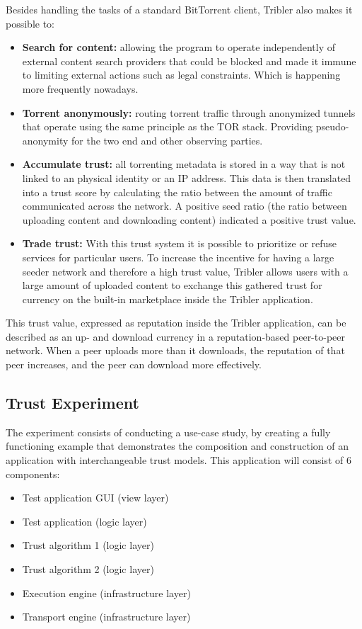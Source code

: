 Besides handling the tasks of a standard BitTorrent client, Tribler also makes it possible to:

\begin{itemize}
	\item \textbf{Search for content: } allowing the program to operate independently of external content search providers that could be blocked and made it immune to limiting external actions such as legal constraints. Which is happening more frequently nowadays.
	\item \textbf{Torrent anonymously: } routing torrent traffic through anonymized tunnels that operate using the same principle as the TOR stack. Providing pseudo-anonymity for the two end and other observing parties.
	\item \textbf{Accumulate trust: } all torrenting metadata is stored in a way that is not linked to an physical identity or an IP address. This data is then translated into a trust score by calculating the ratio between the amount of traffic communicated across the network. A positive seed ratio (the ratio between uploading content and downloading content) indicated a positive trust value.
	\item \textbf{Trade trust: } With this trust system it is possible to prioritize or refuse services for particular users. To increase the incentive for having a large seeder network and therefore a high trust value, Tribler allows users with a large amount of uploaded content to exchange this gathered trust for currency on the built-in marketplace inside the Tribler application.
\end{itemize}

This trust value, expressed as reputation inside the Tribler application, can be described as an up- and download currency in a reputation-based peer-to-peer network. When a peer uploads more than it downloads, the reputation of that peer increases, and the peer can download more effectively.

\subsection{Trust Experiment}

The experiment consists of conducting a use-case study, by creating a fully functioning example that demonstrates the composition and construction of an application with interchangeable trust models. This application will consist of 6 components:

\begin{itemize}
	\item Test application GUI (view layer)
	\item Test application (logic layer)
	\item Trust algorithm 1 (logic layer)
	\item Trust algorithm 2 (logic layer)
	\item Execution engine (infrastructure layer)
	\item Transport engine (infrastructure layer)
\end{itemize}

